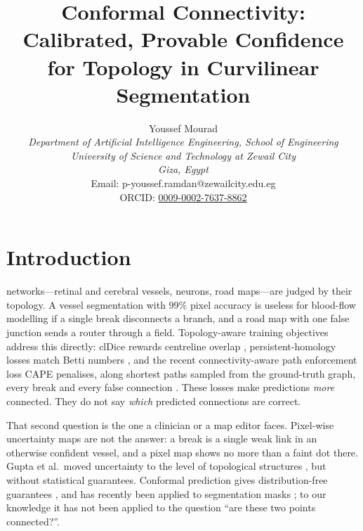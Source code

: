 \documentclass[10pt,letterpaper,journal]{IEEEtran}
\title{{\fontsize{17}{20}\selectfont\bfseries Conformal Connectivity: Calibrated, Provable Confidence\\ for Topology in Curvilinear Segmentation}}
\author{{\fontsize{11}{13}\selectfont Youssef Mourad}\\[3pt]
{\fontsize{10}{12}\selectfont\itshape Department of Artificial Intelligence Engineering, School of Engineering}\\
{\fontsize{10}{12}\selectfont\itshape University of Science and Technology at Zewail City}\\
{\fontsize{10}{12}\selectfont\itshape Giza, Egypt}\\
{\fontsize{10}{12}\selectfont Email: p-youssef.ramdan@zewailcity.edu.eg}\\
{\fontsize{10}{12}\selectfont ORCID: \href{https://orcid.org/0009-0002-7637-8862}{0009-0002-7637-8862}}}
\newcommand{\1}{\mathbf{1}}
\begin{document}
\maketitle

\section{Introduction}
 networks---retinal and cerebral vessels, neurons, road maps---are judged by their topology. A vessel segmentation with 99\% pixel accuracy is useless for blood-flow modelling if a single break disconnects a branch, and a road map with one false junction sends a router through a field. Topology-aware training objectives address this directly: clDice rewards centreline overlap \cite{cldice}, persistent-homology losses match Betti numbers \cite{hu2019,stucki2023}, and the recent connectivity-aware path enforcement loss CAPE penalises, along shortest paths sampled from the ground-truth graph, every break and every false connection \cite{cape}. These losses make predictions \emph{more} connected. They do not say \emph{which} predicted connections are correct.

That second question is the one a clinician or a map editor faces. Pixel-wise uncertainty maps \cite{gal2016,lakshminarayanan2017} are not the answer: a break is a single weak link in an otherwise confident vessel, and a pixel map shows no more than a faint dot there. Gupta et al.\ moved uncertainty to the level of topological structures \cite{gupta2023}, but without statistical guarantees. Conformal prediction gives distribution-free guarantees \cite{vovk2005,angelopoulos2021}, and has recently been applied to segmentation masks \cite{mossina2025}; to our knowledge it has not been applied to the question ``are these two points connected?''.
\end{document}
